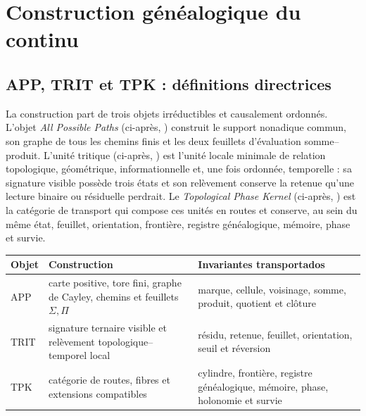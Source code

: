 \label{chap:83-03}

\section{Construction généalogique du continu}

\subsection{APP, TRIT et TPK : définitions directrices}

La construction part de trois objets irréductibles et causalement
ordonnés. L'objet \emph{All Possible Paths} (ci-après, \APP)
construit le support nonadique commun, son graphe de tous les chemins finis et
les deux feuillets d'évaluation somme--produit. L'unité tritique (ci-après,
\TRIT) est l'unité locale minimale de relation topologique, géométrique,
informationnelle et, une fois ordonnée, temporelle : sa signature visible possède trois
états et son relèvement conserve la retenue qu'une lecture binaire ou
résiduelle perdrait. Le \emph{Topological Phase Kernel} (ci-après, \TPK)
est la catégorie de transport qui compose ces unités en routes et conserve,
au sein du même état, feuillet, orientation, frontière, registre généalogique, mémoire, phase et
survie.

\begin{center}
\begin{tabularx}{.94\textwidth}{@{}p{}Y Y@{}}
\toprule
Objet & Construction & Invariantes transportados\\
\midrule
APP & carte positive, tore fini, graphe de Cayley, chemins et feuillets
\(\Sigma,\Pi\) & marque, cellule, voisinage, somme, produit, quotient et clôture\\
TRIT & signature ternaire visible et relèvement topologique--temporel local &
résidu, retenue, feuillet, orientation, seuil et réversion\\
TPK & catégorie de routes, fibres et extensions compatibles & cylindre,
frontière, registre généalogique, mémoire, phase, holonomie et survie\\
\bottomrule
\end{tabularx}
\end{center}

